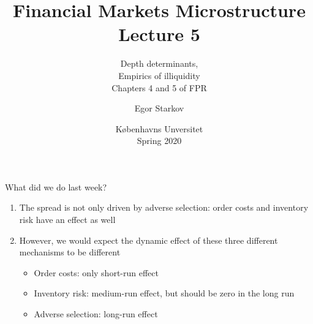 \documentclass[english,10pt
,aspectratio=169
]{beamer}
\title{Financial Markets Microstructure \\ Lecture 5}
\subtitle{Depth determinants, \\ Empirics of illiquidity\\
	Chapters 4 and 5 of FPR}
\author{Egor Starkov}
\date{K{\o}benhavns Unversitet \\
	Spring 2020}
\begin{document}
	

\frame[plain]{\titlepage}


\begin{frame}{What did we do last week?}
	\begin{enumerate}
		\item The spread is not only driven by adverse selection: order costs and inventory risk have an effect as well
		\item However, we would expect the dynamic effect of these three different mechanisms to be different
		\begin{itemize}
			\item Order costs: only short-run effect 
			\item Inventory risk: medium-run effect, but should be zero in the long run
			\item Adverse selection: long-run effect 
		\end{itemize}
	\end{enumerate}
\end{frame}


\end{document}
